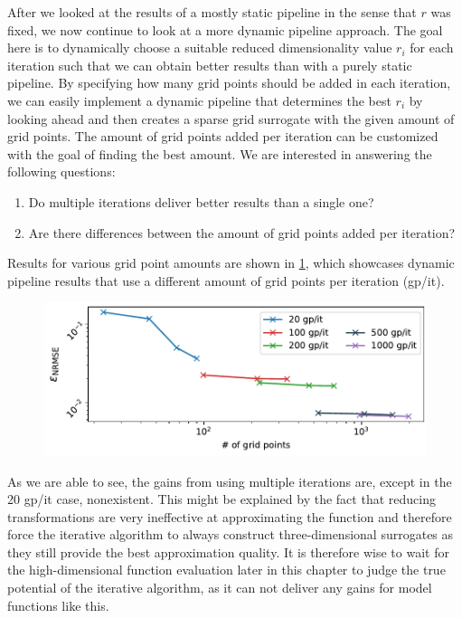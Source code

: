 \documentclass[
  a4paper,  %
  twoside,  %
  bibliography=totoc,
  headsepline,
  cleardoublepage=empty,
  parskip=half,
  draft=false
]{scrbook}
\begin{document}
After we looked at the results of a mostly static pipeline in the sense that $r$ was fixed, we now continue to look at a more dynamic pipeline approach.
The goal here is to dynamically choose a suitable reduced dimensionality value $r_i$ for each iteration such that we can obtain better results than with a purely static pipeline.
By specifying how many grid points should be added in each iteration, we can easily implement a dynamic pipeline that determines the best $r_i$ by looking ahead and then creates a sparse grid surrogate with the given amount of grid points.
The amount of grid points added per iteration can be customized with the goal of finding the best amount.
We are interested in answering the following questions:
\begin{enumerate}
\item Do multiple iterations deliver better results than a single one?
\item Are there differences between the amount of grid points added per iteration?
\end{enumerate}
Results for various grid point amounts are shown in \cref{fig:ww_dyn}, which showcases dynamic pipeline results that use a different amount of grid points per iteration (gp/it).

\begin{mdframed}[style=style]
\begin{figure}[H]
\vspace{-2mm}
\includegraphics[width=\textwidth]{graphics/ishigami_dynamic}\vspace{-4mm}
\delimit
{}
\label{fig:ww_dyn}
\end{figure}
\end{mdframed}
%
As we are able to see, the gains from using multiple iterations are, except in the 20 gp/it case, nonexistent.
This might be explained by the fact that reducing transformations are very ineffective at approximating the function and therefore force the iterative algorithm to always construct three-dimensional surrogates as they still provide the best approximation quality.
It is therefore wise to wait for the high-dimensional function evaluation later in this chapter to judge the true potential of the iterative algorithm, as it can not deliver any gains for model functions like this.
\end{document}
